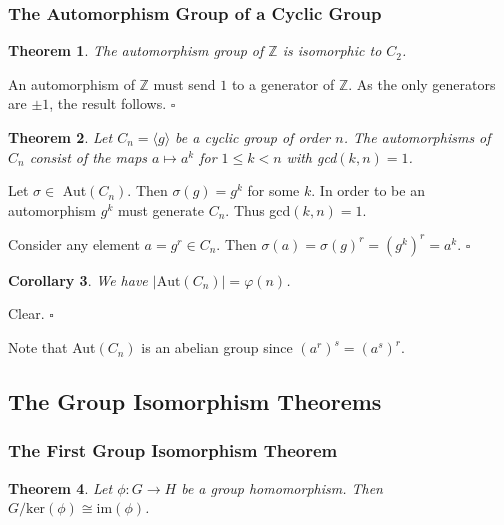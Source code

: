 \documentclass[10pt]{article}
\newtheorem{theorem}{Theorem}[section]
\newtheorem{corollary}[theorem]{Corollary}
\newenvironment{proof}[1][Proof]{\begin{trivlist}
\item[\hskip \labelsep {\itshape #1}]}{\end{trivlist}}
\begin{document}
\subsubsection{The Automorphism Group of a Cyclic Group}

\begin{theorem}
The automorphism group of $\mathbb{Z}$ is isomorphic to $C_2$.
\end{theorem}

\begin{proof}
An automorphism of $\mathbb{Z}$ must send $1$ to a generator of $\mathbb{Z}$. As the only generators are $\pm 1$, the result follows. $\square$
\end{proof}

\begin{theorem}
Let $C_n = \langle g \rangle$ be a cyclic group of order $n$. The automorphisms of $C_n$ consist of the maps $a \mapsto a^k$ for $1 \leq k < n$ with gcd$(k, n) = 1$.
\end{theorem}

\begin{proof}
Let $\sigma \in$ Aut$(C_n)$. Then $\sigma(g) = g^k$ for some $k$. In order to be an automorphism $g^k$ must generate $C_n$. Thus gcd$(k, n) = 1$.

Consider any element $a = g^r \in C_n$. Then $\sigma(a) = \sigma(g)^r = (g^k)^r = a^k$. $\square$
\end{proof}

\begin{corollary}
We have $|\mbox{Aut}(C_n)| = \varphi(n)$.
\end{corollary}

\begin{proof}
Clear. $\square$
\end{proof}

Note that Aut$(C_n)$ is an abelian group since $(a^r)^s = (a^s)^r$.

\subsection{The Group Isomorphism Theorems}

\subsubsection{The First Group Isomorphism Theorem}

\begin{theorem}
Let $\phi : G \to H$ be a group homomorphism. Then $G/\mbox{ker}(\phi) \cong \mbox{im}(\phi)$.
\end{theorem}
\end{document}
